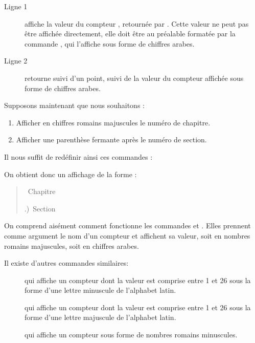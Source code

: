 \begin{description}
\item[Ligne 1] affiche la valeur  du compteur , retournée par . Cette valeur ne peut pas être affichée directement, elle doit être au préalable formatée par la commande , qui l'affiche sous forme de chiffres arabes.
\item[Ligne 2] retourne  suivi d'un point, suivi de la valeur du compteur  affichée sous forme de chiffres arabes.
\end{description}

Supposons maintenant que nous souhaitons  :
\begin{enumerate}
\item Afficher en chiffres romains majuscules le numéro de chapitre.
\item Afficher une parenthèse fermante après le numéro de section.
\end{enumerate}

Il nous suffit de redéfinir ainsi ces commandes :

\begin{latexcode}
\renewcommand \thechapter {\Roman{chapter}}
\renewcommand \thesection {\arabic{section}}
\end{latexcode} 






On obtient donc un affichage de la forme :


\makeatletter
\let\oldthechapter\thechapter
\let\oldthesection\thesection
\renewcommand \thechapter {\@Roman\c@chapter}
\renewcommand \thesection {\thechapter.\@arabic\c@section)}
\makeatother
\begin{quotation}
\thechapter~Chapitre 

\thesection~Section
\end{quotation}
\renewcommand{\thechapter}{\oldthechapter}
\renewcommand{\thesection}{\oldthesection}

On comprend aisément comment fonctionne les commandes  et . Elles prennent comme argument le nom d'un compteur et affichent sa valeur, soit en nombres romains majuscules, soit en chiffres arabes. 

Il existe d'autres commandes similaires:
\begin{description}
 \item[]qui affiche un compteur dont la valeur est comprise entre 1 et 26 sous la forme d'une lettre minuscule de l'alphabet latin. 
  \item[]qui affiche un compteur dont la valeur est comprise entre 1 et 26 sous la forme d'une lettre majuscule de l'alphabet latin. 
 \item[]qui affiche un compteur sous forme de nombres romains minuscules.
\end{description}

